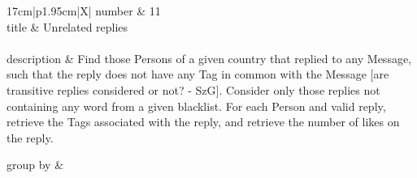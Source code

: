 \renewcommand*{\arraystretch}{1.1}

\noindent\begin{tabularx}{17cm}{|p{1.95cm}|X|}
	\hline
	number      & 11                                                          \\ \hline
%
	title       & Unrelated replies                                                           \\ \hline
	 \\ \hline
	description & Find those Persons of a given country that replied to any Message, such
that the reply does not have any Tag in common with the Message {[}are
transitive replies considered or not? - SzG{]}. Consider only those
replies not containing any word from a given blacklist. For each Person
and valid reply, retrieve the Tags associated with the reply, and
retrieve the number of likes on the reply.
 \\ \hline
	
%
	group by       &
	 \\ \hline
	

\end{tabularx}
